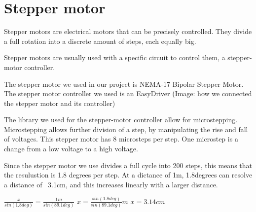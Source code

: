 \clearpage
\section{Stepper motor}
Stepper motors are electrical motors that can be precisely controlled. They divide a full rotation into a discrete amount of steps, each equally big.

Stepper motors are usually used with a specific circuit to control them, a stepper-motor controller.

The stepper motor we used in our project is NEMA-17 Bipolar Stepper Motor.
\cite{steppermotor}
The stepper motor controller we used is an EasyDriver
\cite{steppercontroller}
(Image: how we connected the stepper motor and its controller)


The library we used for the stepper-motor controller allow for microstepping. Microstepping allows further division of a step, by manipulating the rise and fall of voltages.
This stepper motor has 8 microsteps per step. One microstep is a change from a low voltage to a high voltage.



Since the stepper motor we use divides a full cycle into 200 steps, this means that the resulustion is 1.8 degrees per step. At a dictance of 1m, 1.8degrees can resolve a distance of ~3.1cm, and this increases linearly with a larger distance.

$\frac{x}{sin(1.8deg)} = \frac{1m}{sin(89.1deg)}$
$x = \frac{sin(1.8deg)}{sin(89.1deg)}m$
$x = 3.14cm$
